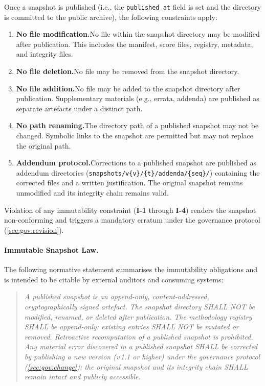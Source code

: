Once a snapshot is published (i.e., the \texttt{published\_at} field is set
and the directory is committed to the public archive), the following
constraints apply:

\begin{enumerate}[label=\textbf{I-\arabic*}.]
  \item \textbf{No file modification.}\enspace  No file within the snapshot
    directory may be modified after publication.  This includes the manifest,
    score files, registry, metadata, and integrity files.
  \item \textbf{No file deletion.}\enspace  No file may be removed from the
    snapshot directory.
  \item \textbf{No file addition.}\enspace  No file may be added to the
    snapshot directory after publication.  Supplementary materials (e.g.,
    errata, addenda) are published as separate artefacts under a distinct
    path.
  \item \textbf{No path renaming.}\enspace  The directory path of a
    published snapshot may not be changed.  Symbolic links to the snapshot
    are permitted but may not replace the original path.
  \item \textbf{Addendum protocol.}\enspace  Corrections to a published
    snapshot are published as addendum directories
    (\texttt{snapshots/v\{v\}/\{t\}/addenda/\{seq\}/}) containing the
    corrected files and a written justification.  The original snapshot
    remains unmodified and its integrity chain remains valid.
\end{enumerate}

Violation of any immutability constraint (\textbf{I-1} through \textbf{I-4})
renders the snapshot non-conforming and triggers a mandatory erratum under
the governance protocol (\cref{sec:gov:revision}).

\paragraph{Immutable Snapshot Law.}
The following normative statement summarises the immutability obligations
and is intended to be citable by external auditors and consuming systems:

\begin{quote}\itshape
A published \ISI snapshot is an append-only, content-addressed,
cryptographically signed artefact.  The snapshot directory SHALL NOT be
modified, renamed, or deleted after publication.  The methodology registry
SHALL be append-only: existing entries SHALL NOT be mutated or removed.
Retroactive recomputation of a published snapshot is prohibited.  Any
material error discovered in a published snapshot SHALL be corrected by
publishing a new version (v\,1.1 or higher) under the governance protocol
(\cref{sec:gov:change}); the original snapshot and its integrity chain
SHALL remain intact and publicly accessible.
\end{quote}

